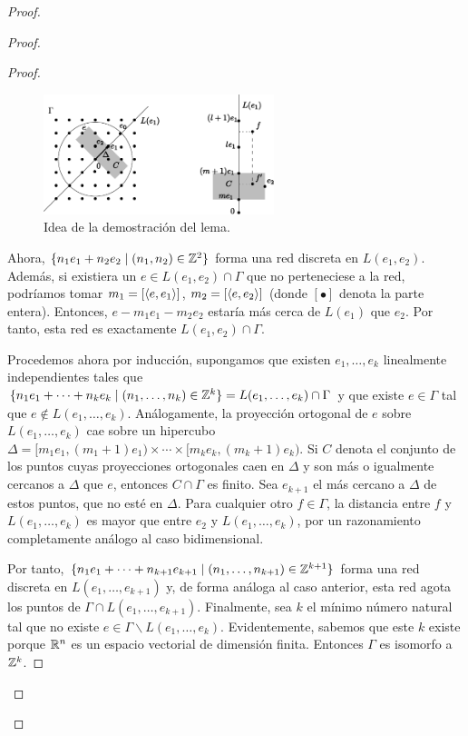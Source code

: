 \begin{proof}
\begin{proof}
\begin{proof}
  \begin{figure}[h]
    \centering
    \includegraphics[width=0.6\textwidth]{pics/grupo.pdf}
    \caption{\small Idea de la demostración del lema.}
    \label{fig:grupo}
  \end{figure}

  Ahora, $\{n_1e_1+n_2e_2 \mid (n_1,n_2) \in \mathbb{Z}^2 \}$ forma una red discreta en $L(e_1,e_2)$. Además, si existiera un $e\in L(e_1,e_2)\cap \Gamma$ que no perteneciese a la red, podríamos tomar $m_1=[\left\langle e,e_1\right\rangle]$, $m_2=[\left\langle e,e_2\right\rangle]$ (donde $[\bullet]$ denota la parte entera). Entonces, $e-m_1e_1-m_2e_2$ estaría más cerca de $L(e_1)$ que $e_2$. Por tanto, esta red es exactamente $L(e_1,e_2) \cap \Gamma$.

      Procedemos ahora por inducción, supongamos que existen $e_1,\dots,e_k$ linealmente independientes tales que $\{n_1e_1+\cdots+n_ke_k \mid (n_1,\dots,n_k) \in \mathbb{Z}^k \} = L(e_1,\dots,e_k) \cap \Gamma$ y que existe $e\in \Gamma$ tal que $e \not\in L(e_1,\dots,e_k)$. Análogamente, la proyección ortogonal de $e$ sobre $L(e_1,\dots,e_k)$ cae sobre un hipercubo $\Delta=[m_1e_1,(m_1+1)e_1) \times \cdots \times [m_ke_k,(m_k+1)e_k)$. Si $C$ denota el conjunto de los puntos cuyas proyecciones ortogonales caen en $\Delta$ y son más o igualmente cercanos a $\Delta$ que $e$, entonces $C \cap \Gamma$ es finito. Sea $e_{k+1}$ el más cercano a $\Delta$ de estos puntos, que no esté en $\Delta$. Para cualquier otro $f \in \Gamma$, la distancia entre $f$ y $L(e_1,\dots,e_k)$ es mayor que entre $e_2$ y $L(e_1,\dots,e_k)$, por un razonamiento completamente análogo al caso bidimensional. 

	Por tanto, $\{n_1e_1+\dots+n_{k+1}e_{k+1} \mid (n_1,\dots,n_{k+1}) \in \mathbb{Z}^{k+1}\}$ forma una red discreta en $L(e_1,\dots,e_{k+1})$ y, de forma análoga al caso anterior, esta red agota los puntos de $\Gamma\cap L(e_1,\dots,e_{k+1})$.
	Finalmente, sea $k$ el mínimo número natural tal que no existe $e \in \Gamma \backslash L(e_1,\dots,e_k)$. Evidentemente, sabemos que este $k$ existe porque $\mathbb{R}^n$ es un espacio vectorial de dimensión finita. Entonces $\Gamma$ es isomorfo a $\mathbb{Z}^k$.
\end{proof}


\end{proof}
\end{proof}
